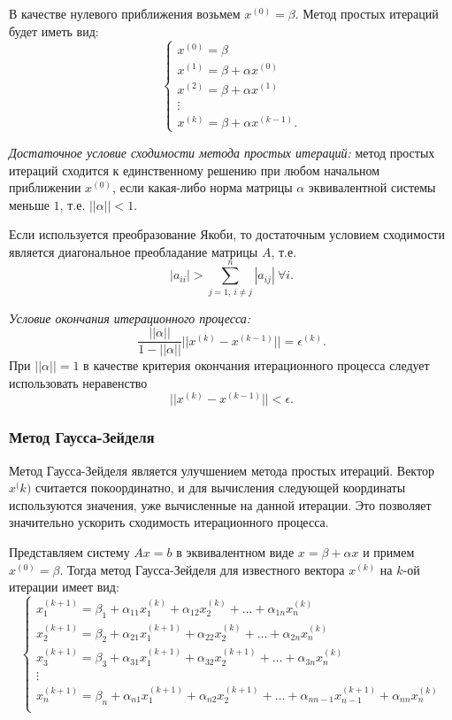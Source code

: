 \documentclass[a4paper,12pt]{article}
\begin{document}
В качестве нулевого приближения возьмем $x^{(0)} = \beta$.
Метод простых итераций будет иметь вид:
$$
\left\{
    \begin{array}{l}
        x^{(0)} = \beta \\
        x^{(1)} = \beta + \alpha x^{(0)} \\
        x^{(2)} = \beta + \alpha x^{(1)} \\
        \vdots \\
        x^{(k)} = \beta + \alpha x^{(k - 1)}.
    \end{array}
    \right.
$$

\textit{Достаточное условие сходимости метода простых итераций:}
метод простых итераций сходится к единственному
решению при любом начальном приближении $x^{(0)}$,
если какая-либо норма матрицы $\alpha$ эквивалентной системы
меньше $1$, т.е. $|| \alpha || < 1$.

Если используется преобразование Якоби, то достаточным
условием сходимости является диагональное преобладание
матрицы $A$, т.е.
$$
|a_{ii}| > \sum_{j = 1,\ i \not = j}^{n} |a_{ij}|\ \forall i.
$$

\textit{Условие окончания итерационного процесса:}
$$
\frac{||\alpha||}{1 - ||\alpha||} || x^{(k)} - x^{(k - 1)} ||
= \epsilon^{(k)}.
$$
При $||\alpha|| = 1$ в качестве критерия окончания
итерационного процесса следует использовать неравенство
$$
|| x^{(k)} - x^{(k - 1)} || < \epsilon.
$$

\subsubsection{Метод Гаусса-Зейделя}
Метод Гаусса-Зейделя является улучшением метода простых итераций.
Вектор $x^({k)}$ считается покоординатно, и для вычисления
следующей координаты используются значения, уже вычисленные
на данной итерации. Это позволяет значительно ускорить
сходимость итерационного процесса.

Представляем систему $Ax = b$ в эквивалентном виде
$x = \beta + \alpha x$ и примем $x^{(0)} = \beta$.
Тогда метод Гаусса-Зейделя для известного
вектора $x^{(k)}$ на $k$-ой итерации имеет вид:
$$
\left\{
    \begin{array}{l}
        x_1^{(k + 1)} = \beta_1 + \alpha_{11} x_1^{(k)} +
            \alpha_{12} x_2^{(k)} + \ldots + \alpha_{1n} x_n^{(k)} \\
        x_2^{(k + 1)} = \beta_2 + \alpha_{21} x_1^{(k + 1)} +
            \alpha_{22} x_2^{(k)} + \ldots + \alpha_{2n} x_n^{(k)} \\
        x_3^{(k + 1)} = \beta_3 + \alpha_{31} x_1^{(k + 1)} +
            \alpha_{32} x_2^{(k + 1)} + \ldots + \alpha_{3n} x_n^{(k)} \\
        \vdots \\
        x_n^{(k + 1)} = \beta_n + \alpha_{n1} x_1^{(k + 1)} +
            \alpha_{n2} x_2^{(k + 1)} + \ldots +
            \alpha_{n n-1} x_{n - 1}^{(k + 1)}  +
            \alpha_{nn} x_n^{(k)} \\
    \end{array}
    \right.
$$
\end{document}

